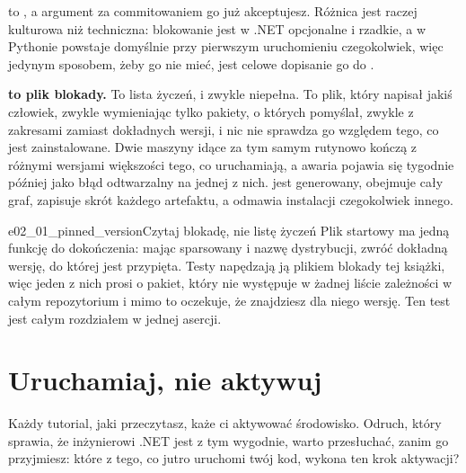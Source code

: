 \begin{csbox}
 to , a argument za commitowaniem go
już akceptujesz. Różnica jest raczej kulturowa niż techniczna: blokowanie jest
w .NET opcjonalne i rzadkie, a w Pythonie  powstaje domyślnie
przy pierwszym uruchomieniu czegokolwiek, więc jedynym sposobem, żeby go nie
mieć, jest celowe dopisanie go do .
\end{csbox}

\begin{trapbox}
\textbf{ to plik blokady.} To lista życzeń, i zwykle
niepełna. To plik, który napisał jakiś człowiek, zwykle wymieniając tylko
pakiety, o których pomyślał, zwykle z zakresami zamiast dokładnych wersji, i
nic nie sprawdza go względem tego, co jest zainstalowane. Dwie maszyny idące
za tym samym  rutynowo kończą z różnymi wersjami
większości tego, co uruchamiają, a awaria pojawia się tygodnie później jako
błąd odtwarzalny na jednej z nich.  jest generowany, obejmuje
cały graf, zapisuje skrót każdego artefaktu, a  odmawia
instalacji czegokolwiek innego.
\end{trapbox}


\begin{exercise}{e02_01_pinned_version}{Czytaj blokadę, nie listę życzeń}
Plik startowy ma jedną funkcję do dokończenia: mając sparsowany
 i nazwę dystrybucji, zwróć dokładną wersję, do której jest
przypięta. Testy napędzają ją plikiem blokady tej książki, więc jeden z nich
prosi o pakiet, który nie występuje w żadnej liście zależności w całym
repozytorium \dash{} i mimo to oczekuje, że znajdziesz dla niego wersję. Ten
test jest całym rozdziałem w jednej asercji.
\end{exercise}

\section{Uruchamiaj, nie aktywuj}
\label{sec:ch02-run}

\noindent
Każdy tutorial, jaki przeczytasz, każe ci aktywować środowisko. Odruch, który
sprawia, że inżynierowi .NET jest z tym wygodnie, warto przesłuchać, zanim go
przyjmiesz: które z tego, co jutro uruchomi twój kod, wykona ten krok
aktywacji?

